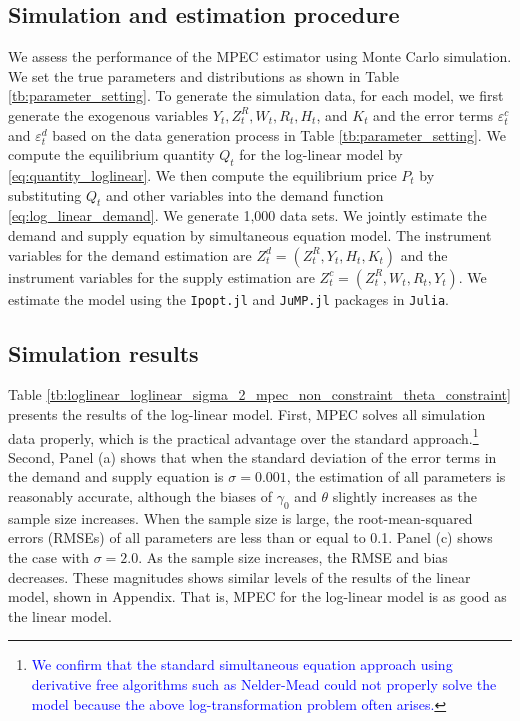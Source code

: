 \documentclass[11pt, a4paper]{article}
\begin{document}
\subsection{Simulation and estimation procedure}
We assess the performance of the MPEC estimator using Monte Carlo simulation.
We set the true parameters and distributions as shown in Table \ref{tb:parameter_setting}. 
To generate the simulation data, for each model, we first generate the exogenous variables $Y_t, Z^{R}_{t}, W_t, R_{t}, H_t$, and $K_t$ and the error terms $\varepsilon_{t}^c$ and $\varepsilon_{t}^d$ based on the data generation process in Table \ref{tb:parameter_setting}.
We compute the equilibrium quantity $Q_{t}$ for the log-linear model by \eqref{eq:quantity_loglinear}.
We then compute the equilibrium price $P_t$ by substituting $Q_{t}$ and other variables into the demand function \eqref{eq:log_linear_demand}.
We generate 1,000 data sets.
We jointly estimate the demand and supply equation by simultaneous equation model.
The instrument variables for the demand estimation are $Z^{d}_{t} = (Z^{R}_{t}, Y_t, H_{t}, K_{t})$ and the instrument variables for the supply estimation are $Z^{c}_{t} = (Z^{R}_{t}, W_{t}, R_{t}, Y_t)$. 
We estimate the model using the \texttt{Ipopt.jl} and \texttt{JuMP.jl} packages in \texttt{Julia}.

\subsection{Simulation results}

Table \ref{tb:loglinear_loglinear_sigma_2_mpec_non_constraint_theta_constraint} presents the results of the log-linear model. 
First, MPEC solves all simulation data properly, which is the practical advantage over the standard approach.\footnote{\textcolor{blue}{We confirm that the standard simultaneous equation approach using derivative free algorithms such as Nelder-Mead could not properly solve the model because the above log-transformation problem often arises.}}
Second, Panel (a) shows that when the standard deviation of the error terms in the demand and supply equation is $\sigma = 0.001$, the estimation of all parameters is reasonably accurate, although the biases of $\gamma_0$ and $\theta$ slightly increases as the sample size increases.
When the sample size is large, the root-mean-squared errors (RMSEs) of all parameters are less than or equal to 0.1. 
Panel (c) shows the case with $\sigma = 2.0$. 
As the sample size increases, the RMSE and bias decreases. These magnitudes shows similar levels of the results of the linear model, shown in Appendix. 
That is, MPEC for the log-linear model is as good as the linear model.
\end{document}
